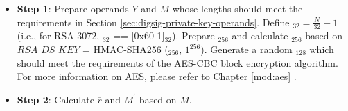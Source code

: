 \documentclass[main\_\_EN.tex]{subfiles}
\begin{document}
\begin{itemize}

    \item {\bfseries Step 1}: Prepare operands \begin{math}Y\end{math} and \begin{math}M\end{math} whose lengths should meet the requirements in Section \ref{sec:digsig-private-key-operands}. Define \begin{math}[L]_{32} = \frac{N}{32}-1 \end{math} (i.e., for RSA 3072, \begin{math}[L]_{32}\end{math} == [0x60-1]\begin{math}_{32}\end{math}). Prepare \begin{math}[HMAC\_KEY]_{256}\end{math} and calculate \begin{math}[RSA\_DS\_KEY]_{256}\end{math} based on \begin{math}RSA\_DS\_KEY\end{math} = HMAC-SHA256 (\begin{math}[HMAC\_KEY]_{256}\end{math}, \begin{math}1^{256}\end{math}). Generate a random \begin{math}[IV]_{128}\end{math} which should meet the requirements of the AES-CBC block encryption algorithm. For more information on AES, please refer to Chapter \ref{mod:aes} \textit{}.
    
    \item {\bfseries Step 2}: Calculate \begin{math}\overline{r}\end{math} and \begin{math}M^{\prime} \end{math} based on \begin{math}M\end{math}.
    

\end{itemize}
\end{document}
